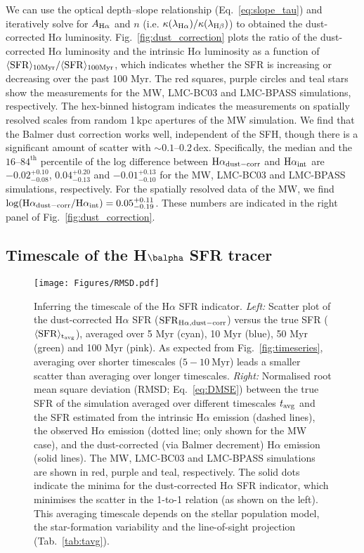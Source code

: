 \documentclass[fleqn,usenatbib]{mnras}
\begin{document}
We can use the optical depth--slope relationship (Eq.~\ref{eq:slope_tau}) and iteratively solve for $A_{\rm H\alpha}$ and $n$ (i.e. $\kappa(\lambda_{\rm H\alpha})/\kappa(\lambda_{\rm H\beta})$)  to obtained the dust-corrected H$\alpha$ luminosity. Fig.~\ref{fig:dust_correction} plots the ratio of the dust-corrected H$\alpha$ luminosity and the intrinsic H$\alpha$ luminosity as a function of $\langle\mathrm{SFR}\rangle_{\rm 10Myr}/\langle\mathrm{SFR}\rangle_{\rm 100Myr}$, which indicates whether the SFR is increasing or decreasing over the past 100 Myr. The red squares, purple circles and teal stars show the measurements for the MW, LMC-BC03 and LMC-BPASS simulations, respectively. The hex-binned histogram indicates the measurements on spatially resolved scales from random 1\,kpc apertures of the MW simulation. We find that the Balmer dust correction works well, independent of the SFH, though there is a significant amount of scatter with $\sim0.1$--$0.2$\,dex. Specifically, the median and the $16$--$84^\text{th}$ percentile of the log difference between $\mathrm{H}\alpha_{\rm dust-corr}$ and $\mathrm{H}\alpha_{\rm int}$ are $-0.02_{-0.08}^{+0.10}$, $0.04_{-0.13}^{+0.20}$ and $-0.01_{-0.10}^{+0.13}$ for the MW, LMC-BC03 and LMC-BPASS simulations, respectively. For the spatially resolved data of the MW, we find $\log(\mathrm{H}\alpha_{\rm dust-corr}/\mathrm{H}\alpha_{\rm int})=0.05_{-0.19}^{+0.11}$. These numbers are indicated in the right panel of Fig.~\ref{fig:dust_correction}.


\subsection{Timescale of the H\texorpdfstring{$\balpha$}{α} SFR tracer}
\label{subsec:timescale}

\begin{figure*}
\texttt{[image: Figures/RMSD.pdf]}
\caption{Inferring the timescale of the H$\alpha$ SFR indicator. \textit{Left:} Scatter plot of the dust-corrected H$\alpha$ SFR ($\mathrm{SFR}_{\rm H\alpha,dust-corr}$) versus the true SFR ($\langle \mathrm{SFR} \rangle_{\rm t_{\rm avg}}$), averaged over 5 Myr (cyan), 10 Myr (blue), 50 Myr (green) and 100 Myr (pink). As expected from Fig.~\ref{fig:timeseries}, averaging over shorter timescales ($5-10~\mathrm{Myr}$) leads a smaller scatter than averaging over longer timescales. \textit{Right:} Normalised root mean square deviation (RMSD; Eq.~\ref{eq:DMSE}) between the true SFR of the simulation averaged over different timescales $t_{\rm avg}$ and the SFR estimated from the intrinsic H$\alpha$ emission (dashed lines), the observed H$\alpha$ emission (dotted line; only shown for the MW case), and the dust-corrected (via Balmer decrement) H$\alpha$ emission (solid lines). The MW, LMC-BC03 and LMC-BPASS simulations are shown in red, purple and teal, respectively. The solid dots indicate the minima for the dust-corrected H$\alpha$ SFR indicator, which minimises the scatter in the 1-to-1 relation (as shown on the left). This averaging timescale depends on the stellar population model, the star-formation variability and the line-of-sight projection (Tab.~\ref{tab:tavg}).}
\label{fig:Halpha_timescale}
\end{figure*}
\end{document}
